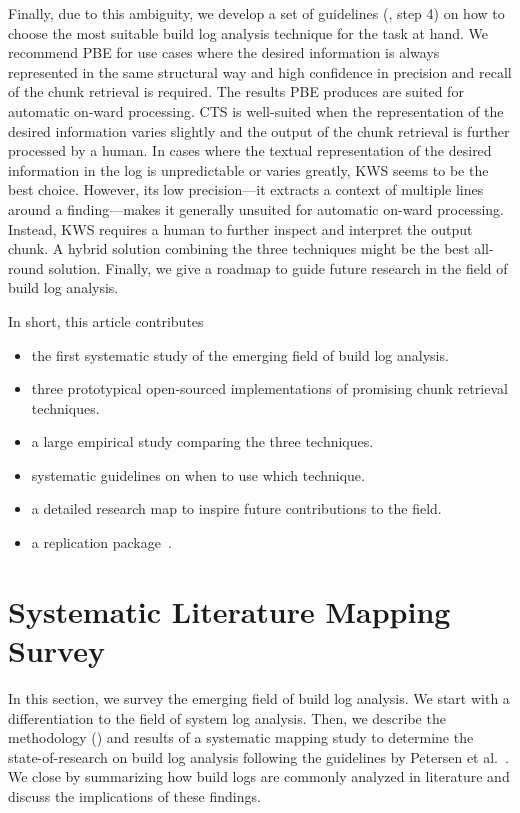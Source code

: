 Finally, due to this ambiguity, we develop a set of guidelines
(, step 4)
on how to choose the most suitable build log analysis
technique for the task at hand.
We recommend PBE for use cases where the desired information is always
represented in the same structural way and high confidence in
precision and recall of the chunk retrieval is required.
The results PBE produces are suited for automatic on-ward processing.
CTS is
well-suited when the representation of the desired information varies
slightly and the output of the chunk retrieval is further processed by
a human.
In cases where the textual representation of the desired
information in the log is unpredictable or varies greatly, KWS seems
to be the best choice.
However, its low precision---it extracts a
context of multiple lines around a finding---makes it generally
unsuited for automatic on-ward processing.
Instead, KWS requires a human
to further inspect and interpret the output chunk.
A hybrid solution combining the three techniques might be the best
all-round solution.
Finally, we give a roadmap to guide future research in the field
of build log analysis.

In short, this article contributes
\begin{itemize}
\item the first systematic study of the emerging field of build log
analysis.
\item three prototypical open-sourced implementations of
promising chunk retrieval techniques.
\item a large empirical study comparing the three techniques.
\item systematic guidelines on when to use which technique.
\item a detailed research map to inspire future contributions to the
field.
\item a replication package~\cite{brandt2020chunk-replication}.
\end{itemize}

\section{Systematic Literature Mapping Survey}
\label{sec:survey}

In this section, we survey the emerging field of build log
analysis.
We start with a differentiation to the field of
system log analysis.
Then, we describe the methodology ()
and results of a systematic mapping
study to
determine the state-of-research on build log analysis following the
guidelines by Petersen et
al.~\cite{petersen2008systematic,petersen2015guidelines}.
We close by summarizing how build logs are commonly
analyzed in literature and discuss the implications of these findings.

